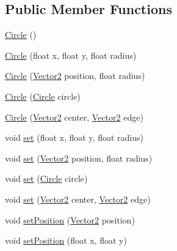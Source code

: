 \subsection*{Public Member Functions}
\begin{DoxyCompactItemize}
\item 
\hyperlink{classairhockeyjava_1_1util_1_1_circle_a85a4e1da69814da1179351bebf2a77ee}{Circle} ()
\item 
\hyperlink{classairhockeyjava_1_1util_1_1_circle_ae247f859b9bea09a0fc4f93e29870602}{Circle} (float x, float y, float radius)
\item 
\hyperlink{classairhockeyjava_1_1util_1_1_circle_a61a7a9edb3d174826f94edc635126fc0}{Circle} (\hyperlink{classairhockeyjava_1_1util_1_1_vector2}{Vector2} position, float radius)
\item 
\hyperlink{classairhockeyjava_1_1util_1_1_circle_a5f989f545390eaed1ad67e29680f18c3}{Circle} (\hyperlink{classairhockeyjava_1_1util_1_1_circle}{Circle} circle)
\item 
\hyperlink{classairhockeyjava_1_1util_1_1_circle_a8d2b6f6f84bed2805fdfc2b7c616ac0c}{Circle} (\hyperlink{classairhockeyjava_1_1util_1_1_vector2}{Vector2} center, \hyperlink{classairhockeyjava_1_1util_1_1_vector2}{Vector2} edge)
\item 
void \hyperlink{classairhockeyjava_1_1util_1_1_circle_af8ef12953f8783661489fc6bcbce3003}{set} (float x, float y, float radius)
\item 
void \hyperlink{classairhockeyjava_1_1util_1_1_circle_a368a9f1538f4b8495efdca70f0379508}{set} (\hyperlink{classairhockeyjava_1_1util_1_1_vector2}{Vector2} position, float radius)
\item 
void \hyperlink{classairhockeyjava_1_1util_1_1_circle_ad85e629be87054cf4c3f53080fce9257}{set} (\hyperlink{classairhockeyjava_1_1util_1_1_circle}{Circle} circle)
\item 
void \hyperlink{classairhockeyjava_1_1util_1_1_circle_a60de0a0a902025a8649fe2a5750ce0c7}{set} (\hyperlink{classairhockeyjava_1_1util_1_1_vector2}{Vector2} center, \hyperlink{classairhockeyjava_1_1util_1_1_vector2}{Vector2} edge)
\item 
void \hyperlink{classairhockeyjava_1_1util_1_1_circle_a87dbb46ad9d49dc32af839184c035198}{set\+Position} (\hyperlink{classairhockeyjava_1_1util_1_1_vector2}{Vector2} position)
\item 
void \hyperlink{classairhockeyjava_1_1util_1_1_circle_a760d5c6e012e88b51ebbba6c461caba8}{set\+Position} (float x, float y)
\item 

\end{DoxyCompactItemize}
